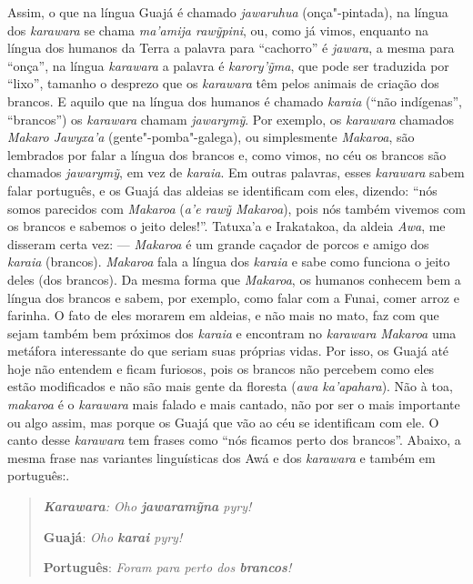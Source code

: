 Assim, o que na língua Guajá é chamado \emph{jawaruhua} (onça"-pintada),
na língua dos \emph{karawara} se chama \emph{ma'amija rawỹpini}, ou,
como já vimos, enquanto na língua dos humanos da Terra a palavra para
``cachorro'' é \emph{jawara}, a mesma para ``onça'', na língua
\emph{karawara} a palavra é \emph{karory'ỹma}, que pode ser traduzida
por ``lixo'', tamanho o desprezo que os \emph{karawara} têm pelos
animais de criação dos brancos. E aquilo que na língua dos humanos é
chamado \emph{karaia} (``não indígenas'', ``brancos'') os
\emph{karawara} chamam \emph{jawarymỹ}. Por exemplo, os \emph{karawara}
chamados \emph{Makaro Jawyxa'a} (gente"-pomba"-galega), ou simplesmente
\emph{Makaroa}, são lembrados por falar a língua dos brancos e, como
vimos, no céu os brancos são chamados \emph{jawarymỹ}, em vez de
\emph{karaia}. Em outras palavras, esses \emph{karawara} sabem falar
português, e os Guajá das aldeias se identificam com eles, dizendo:
``nós somos parecidos com \emph{Makaroa} (\emph{a'e rawỹ Makaroa}), pois
nós também vivemos com os brancos e sabemos o jeito deles!''. Tatuxa'a e
Irakatakoa, da aldeia \emph{Awa}, me disseram certa vez: --- \emph{Makaroa}
é um grande caçador de porcos e amigo dos \emph{karaia} (brancos).
\emph{Makaroa} fala a língua dos \emph{karaia} e sabe como funciona o
jeito deles (dos brancos). Da mesma forma que \emph{Makaroa}, os humanos
conhecem bem a língua dos brancos e sabem, por exemplo, como falar com a
Funai, comer arroz e farinha. O fato de eles morarem em aldeias, e não
mais no mato, faz com que sejam também bem próximos dos \emph{karaia} e
encontram no \emph{karawara} \emph{Makaroa} uma metáfora interessante do
que seriam suas próprias vidas. Por isso, os Guajá até hoje não entendem
e ficam furiosos, pois os brancos não percebem como eles estão
modificados e não são mais gente da floresta (\emph{awa ka'apahara}).
Não à toa, \emph{makaroa} é o \emph{karawara} mais falado e mais
cantado, não por ser o mais importante ou algo assim, mas porque os
Guajá que vão ao céu se identificam com ele. O canto desse
\emph{karawara} tem frases como ``nós ficamos perto dos brancos''.
Abaixo, a mesma frase nas variantes linguísticas dos Awá e dos
\emph{karawara} e também em português:.

\begin{quote}
\emph{\textbf{Karawara}: Oho \textbf{{jawaramỹna}} pyry!}

\textbf{Guajá}: \emph{Oho \textbf{{karai}} pyry!}

\textbf{Português}: \emph{Foram para perto dos \textbf{{brancos}}!}
\end{quote}

